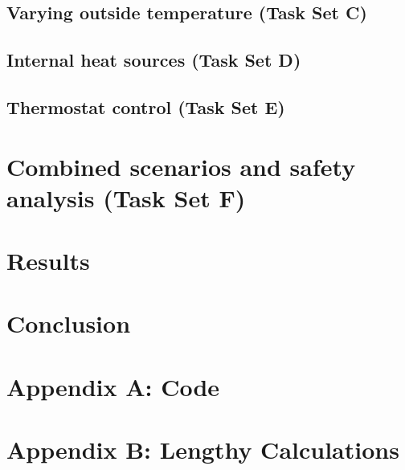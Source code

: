 \documentclass[12pt]{article}
\begin{document}
\subsection{Varying outside temperature (Task Set C)}

\subsection{Internal heat sources (Task Set D)}
\subsection{Thermostat control (Task Set E)}

\section{Combined scenarios and safety analysis (Task Set F)}

\clearpage
\section{Results}

\section{Conclusion}

\clearpage
\appendix
\section{Appendix A: Code}



\section{Appendix B: Lengthy Calculations}
\end{document}
